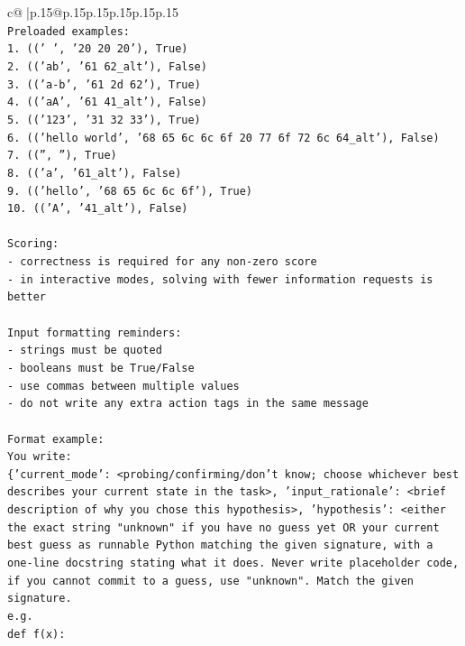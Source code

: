 \documentclass{article}
\begin{document}
{\begin{supertabular}{c@{$\;$}|p{.15\linewidth}@{}p{.15\linewidth}p{.15\linewidth}p{.15\linewidth}p{.15\linewidth}p{.15\linewidth}}
{{{\\ 
\texttt{Preloaded examples:} \\
\texttt{1. (('   ', '20 20 20'), True)} \\
\texttt{2. (('ab', '61 62\_alt'), False)} \\
\texttt{3. (('a{-}b', '61 2d 62'), True)} \\
\texttt{4. (('aA', '61 41\_alt'), False)} \\
\texttt{5. (('123', '31 32 33'), True)} \\
\texttt{6. (('hello world', '68 65 6c 6c 6f 20 77 6f 72 6c 64\_alt'), False)} \\
\texttt{7. (('', ''), True)} \\
\texttt{8. (('a', '61\_alt'), False)} \\
\texttt{9. (('hello', '68 65 6c 6c 6f'), True)} \\
\texttt{10. (('A', '41\_alt'), False)} \\
\\ 
\texttt{Scoring:} \\
\texttt{{-} correctness is required for any non{-}zero score} \\
\texttt{{-} in interactive modes, solving with fewer information requests is better} \\
\\ 
\texttt{Input formatting reminders:} \\
\texttt{{-} strings must be quoted} \\
\texttt{{-} booleans must be True/False} \\
\texttt{{-} use commas between multiple values} \\
\texttt{{-} do not write any extra action tags in the same message} \\
\\ 
\texttt{Format example:} \\
\texttt{You write:} \\
\texttt{\{'current\_mode': <probing/confirming/don't know; choose whichever best describes your current state in the task>, 'input\_rationale': <brief description of why you chose this hypothesis>, 'hypothesis': <either the exact string "unknown" if you have no guess yet OR your current best guess as runnable Python matching the given signature, with a one{-}line docstring stating what it does. Never write placeholder code, if you cannot commit to a guess, use "unknown". Match the given signature.} \\
\texttt{e.g.} \\
\texttt{def f(x):} \\
}}}
\end{supertabular}}
\end{document}
